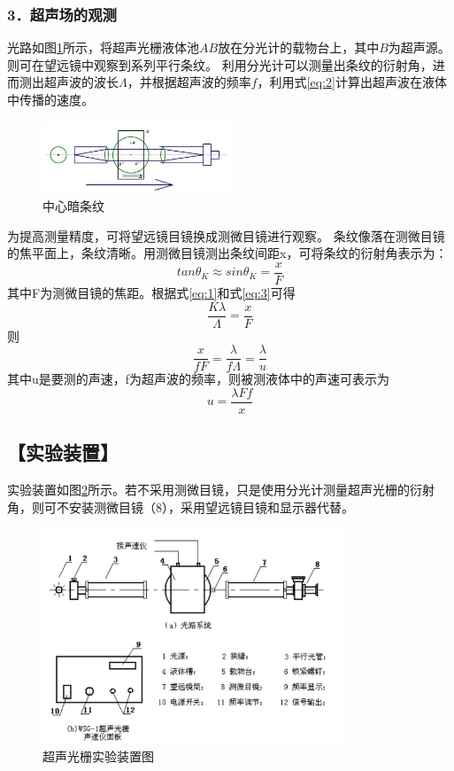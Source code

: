 \documentclass[12pt,a4paper,UTF8]{ctexart}
\begin{document}
\subsubsection*{3．超声场的观测}
	光路如图\ref{fig:illus-4}所示，将超声光栅液体池$AB$放在分光计的载物台上，其中$B$为超声源。则可在望远镜中观察到系列平行条纹。
	利用分光计可以测量出条纹的衍射角，进而测出超声波的波长$\Lambda $，并根据超声波的频率$f$，利用式\ref{eq:2}计算出超声波在液体中传播的速度。
	\begin{figure}[htbp]
		\centering
		\includegraphics[width=0.5\textwidth]{attachments/illus-4.jpg}
		\caption{中心暗条纹}
		\label{fig:illus-4}
	\end{figure}

	为提高测量精度，可将望远镜目镜换成测微目镜进行观察。
	条纹像落在测微目镜的焦平面上，条纹清晰。用测微目镜测出条纹间距x，可将条纹的衍射角表示为：
	\begin{equation}\label{eq:3}
		tan \theta_K\approx sin\theta_K=\frac{x}{F}
	\end{equation}
	其中F为测微目镜的焦距。根据式\ref{eq:1}和式\ref{eq:3}可得
	\begin{equation}
		\frac{K\lambda}{\varLambda }=\frac{x}{F}
	\end{equation}
	则
	\begin{equation}
		\frac{x}{fF}=\frac{\lambda}{f\varLambda}=\frac{\lambda}{u}
	\end{equation}
	其中u是要测的声速，f为超声波的频率，则被测液体中的声速可表示为
	\begin{equation}\label{eq:4}
		u=\frac{\lambda F f}{x}
	\end{equation}
 
\subsection*{【实验装置】}
实验装置如图\ref{fig:5}所示。若不采用测微目镜，只是使用分光计测量超声光栅的衍射角，则可不安装测微目镜（8），采用望远镜目镜和显示器代替。
\begin{figure}[htbp]
	\centering
	\includegraphics[width=0.8\textwidth]{attachments//illus-5.jpg}
	\caption{超声光栅实验装置图}
	\label{fig:5}
\end{figure}
\end{document}
